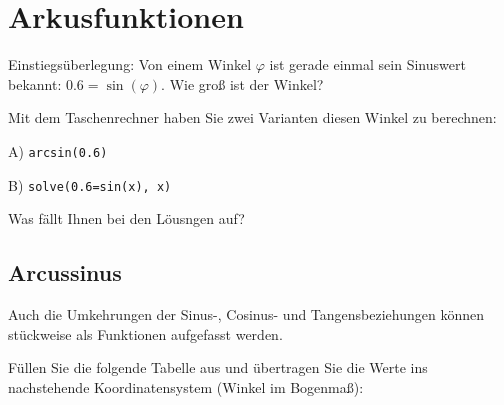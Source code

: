 
\section{Arkusfunktionen}

Einstiegsüberlegung: Von einem Winkel $\varphi$ ist gerade einmal sein Sinuswert bekannt: $0.6 = \sin(\varphi)$. Wie groß ist der Winkel?

\trigsysDsin{}



Mit dem Taschenrechner haben Sie zwei Varianten diesen Winkel zu berechnen:

A) \texttt{arcsin(0.6)}

B) \texttt{solve(0.6=sin(x), x)}

Was fällt Ihnen bei den Löusngen auf?
\newpage



\subsection{Arcussinus}
Auch die Umkehrungen der Sinus-, Cosinus- und Tangensbeziehungen
können stückweise als Funktionen aufgefasst werden.

Füllen Sie die folgende Tabelle aus und übertragen Sie die Werte ins nachstehende
Koordinatensystem (Winkel im Bogenmaß):


